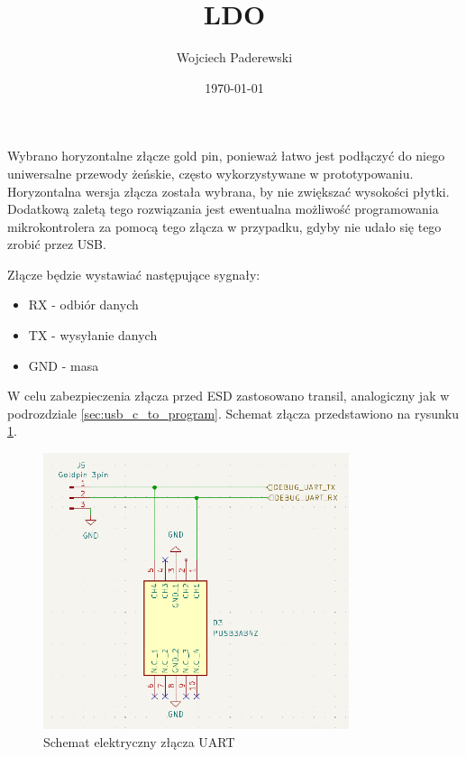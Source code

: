 \documentclass[../../main.tex]{subfiles}
\author{Wojciech Paderewski}
\date{\today}
\title{LDO}
\begin{document}
Wybrano horyzontalne złącze gold pin, ponieważ łatwo jest podłączyć do niego uniwersalne przewody żeńskie, często wykorzystywane w prototypowaniu.
Horyzontalna wersja złącza została wybrana, by nie zwiększać wysokości płytki. Dodatkową zaletą tego rozwiązania jest ewentualna możliwość programowania
mikrokontrolera za pomocą tego złącza w przypadku, gdyby nie udało się tego zrobić przez USB. 

Złącze będzie wystawiać następujące sygnały:
\begin{itemize}
    \item RX - odbiór danych
    \item TX - wysyłanie danych
    \item GND - masa
\end{itemize}

W celu zabezpieczenia złącza przed ESD zastosowano transil, analogiczny jak w podrozdziale \ref{sec:usb_c_to_program}.
Schemat złącza przedstawiono na rysunku \ref{fig:uart}.

\begin{figure}[H]
    \centering
    \includegraphics[width=0.8\textwidth]{uart.png}
    \caption{Schemat elektryczny złącza UART}
    \label{fig:uart}
\end{figure}
\end{document}
